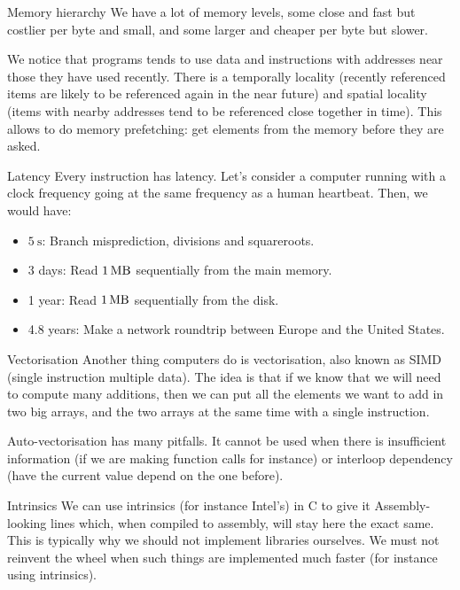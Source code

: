 \documentclass[a4paper]{article}
\begin{document}
\begin{parag}{Memory hierarchy}
    We have a lot of memory levels, some close and fast but costlier per byte and small, and some larger and cheaper per byte but slower.

    We notice that programs tends to use data and instructions with addresses near those they have used recently. There is a temporally locality (recently referenced items are likely to be referenced again in the near future) and spatial locality (items with nearby addresses tend to be referenced close together in time). This allows to do memory prefetching: get elements from the memory before they are asked.
\end{parag}

\begin{parag}{Latency}
    Every instruction has latency. Let's consider a computer running with a clock frequency going at the same frequency as a human heartbeat. Then, we would have:
    \begin{itemize}
        \item $\SI{5}{\second }$: Branch misprediction, divisions and squareroots.
        \item 3 days: Read $\SI{1}{\mega\byte }$ sequentially from the main memory.
        \item 1 year: Read $\SI{1}{\mega\byte }$ sequentially from the disk.
        \item 4.8 years: Make a network roundtrip between Europe and the United States.
    \end{itemize}
\end{parag}

\begin{parag}{Vectorisation}
    Another thing computers do is vectorisation, also known as SIMD (single instruction multiple data). The idea is that if we know that we will need to compute many additions, then we can put all the elements we want to add in two big arrays, and the two arrays at the same time with a single instruction.

    Auto-vectorisation has many pitfalls. It cannot be used when there is insufficient information (if we are making function calls for instance) or interloop dependency (have the current value depend on the one before).
\end{parag}

\begin{parag}{Intrinsics}
    We can use intrinsics (for instance Intel's) in C to give it Assembly-looking lines which, when compiled to assembly, will stay here the exact same. This is typically why we should not implement libraries ourselves. We must not reinvent the wheel when such things are implemented much faster (for instance using intrinsics).
\end{parag}
\end{document}
